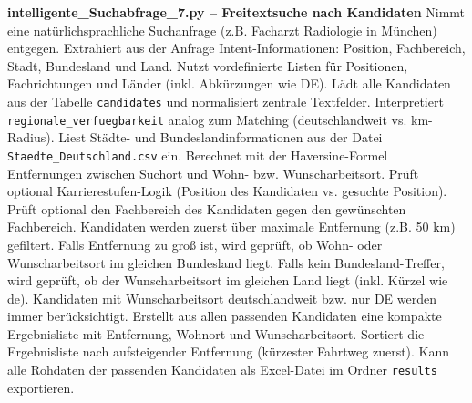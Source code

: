 
\textbf{intelligente\_Suchabfrage\_7.py -- Freitextsuche nach Kandidaten}
Nimmt eine natürlichsprachliche Suchanfrage (z.B. \glqq Facharzt Radiologie in München\grqq{}) entgegen.
Extrahiert aus der Anfrage Intent-Informationen: Position, Fachbereich, Stadt, Bundesland und Land.
Nutzt vordefinierte Listen für Positionen, Fachrichtungen und Länder (inkl. Abkürzungen wie \glqq DE\grqq{}).
Lädt alle Kandidaten aus der Tabelle \texttt{candidates} und normalisiert zentrale Textfelder.
Interpretiert \texttt{regionale\_verfuegbarkeit} analog zum Matching (deutschlandweit vs. km-Radius).
Liest Städte- und Bundeslandinformationen aus der Datei \texttt{Staedte\_Deutschland.csv} ein.
Berechnet mit der Haversine-Formel Entfernungen zwischen Suchort und Wohn- bzw. Wunscharbeitsort.
Prüft optional Karrierestufen-Logik (Position des Kandidaten vs. gesuchte Position).
Prüft optional den Fachbereich des Kandidaten gegen den gewünschten Fachbereich.
Kandidaten werden zuerst über maximale Entfernung (z.B. 50 km) gefiltert.
Falls Entfernung zu groß ist, wird geprüft, ob Wohn- oder Wunscharbeitsort im gleichen Bundesland liegt.
Falls kein Bundesland-Treffer, wird geprüft, ob der Wunscharbeitsort im gleichen Land liegt (inkl. Kürzel wie \glqq de\grqq{}).
Kandidaten mit Wunscharbeitsort \glqq deutschlandweit\grqq{} bzw. nur \glqq DE\grqq{} werden immer berücksichtigt.
Erstellt aus allen passenden Kandidaten eine kompakte Ergebnisliste mit Entfernung, Wohnort und Wunscharbeitsort.
Sortiert die Ergebnisliste nach aufsteigender Entfernung (kürzester Fahrtweg zuerst).
Kann alle Rohdaten der passenden Kandidaten als Excel-Datei im Ordner \texttt{results} exportieren.

